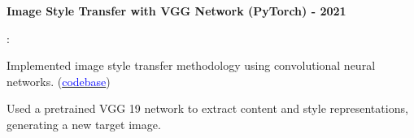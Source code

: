 \documentclass[letterpaper,10.5pt]{article}
\newcommand{\resumeItem}[2]{
  \item\small{
    \textbf{#1}{: #2 \vspace{-1pt}} %
  }
}
\newcommand{\resumeSubItem}[2]{\resumeItem{#1}{#2}\vspace{-1pt}} %
\begin{document}

    



    \resumeSubItem{Image Style Transfer with VGG Network (PyTorch) - 2021}{
    
\item \textbullet \quad Implemented image style transfer methodology using convolutional neural networks. (\href{https://github.com/Chashi-Mahiul-Islam/style-transfer}{\textcolor{blue}{codebase}})

\textbullet \quad Used a pretrained VGG 19 network to extract content and style representations, generating a new target image.
}

    
    
\end{document}
